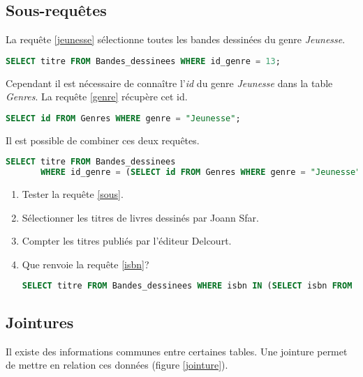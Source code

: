 \documentclass[a4paper,11pt]{article}
\begin{document}
\begin{Form}
\subsection{Sous-requêtes}
La requête \ref{jeunesse} sélectionne toutes les bandes dessinées du genre \emph{Jeunesse}.
\begin{center}
\begin{lstlisting}[language=SQL]
SELECT titre FROM Bandes_dessinees WHERE id_genre = 13;
\end{lstlisting}
\label{jeunesse}
\end{center}
Cependant il est nécessaire de connaître l'\emph{id} du genre \emph{Jeunesse} dans la table \emph{Genres}. La requête \ref{genre} récupère cet id.
\begin{center}
\begin{lstlisting}[language=SQL]
SELECT id FROM Genres WHERE genre = "Jeunesse";
\end{lstlisting}
\label{genre}
\end{center}
Il est possible de combiner ces deux requêtes.
\begin{center}
\begin{lstlisting}[language=SQL]
SELECT titre FROM Bandes_dessinees 
       WHERE id_genre = (SELECT id FROM Genres WHERE genre = "Jeunesse");
\end{lstlisting}
\label{sous}
\end{center}
\begin{activite}
\begin{enumerate}
\item Tester la requête \ref{sous}.
\item Sélectionner les titres de livres dessinés par Joann Sfar.
\item Compter les titres publiés par l'éditeur Delcourt.
\item Que renvoie la requête \ref{isbn}?
\begin{center}
\begin{lstlisting}[language=SQL]
SELECT titre FROM Bandes_dessinees WHERE isbn IN (SELECT isbn FROM Emprunts WHERE id_emprunteurs = 1);
\end{lstlisting}
\label{isbn}
\end{center}
\end{enumerate}
\end{activite}
\subsection{Jointures}
Il existe des informations communes entre certaines tables. Une jointure permet de mettre en relation ces données (figure \ref{jointure}).
\begin{center}
\end{center}
\end{Form}
\end{document}
